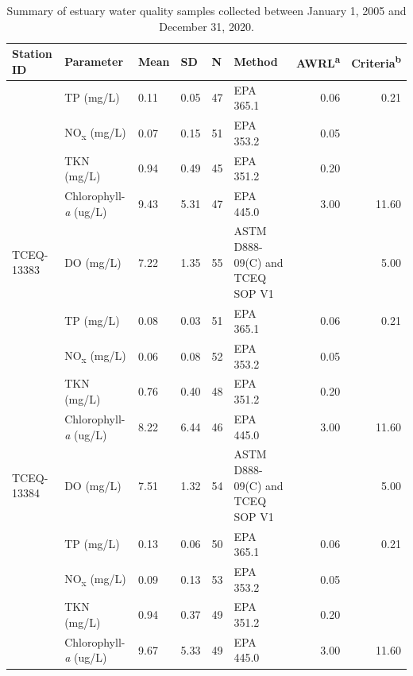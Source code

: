 \documentclass[fleqn,10pt,lineno]{wlpeerj} %
\begin{document}
\begin{table}

\caption{\label{tab:table2}Summary of estuary water quality samples collected between January 1, 2005 and December 31, 2020.}
\centering
\begin{threeparttable}
\begin{tabular}[t]{lllll>{\raggedright\arraybackslash}p{3cm}rr}
\toprule
Station ID & Parameter & Mean & SD & N & Method & AWRL\textsuperscript{a} & Criteria\textsuperscript{b}\\
\midrule
 & TP (mg/L) & 0.11 & 0.05 & 47 & EPA 365.1 & 0.06 & 0.21\\

 & NO\textsubscript{x} (mg/L) & 0.07 & 0.15 & 51 & EPA 353.2 & 0.05 & \\

 & TKN (mg/L) & 0.94 & 0.49 & 45 & EPA 351.2 & 0.20 & \\

 & Chlorophyll-\textit{a} (ug/L) & 9.43 & 5.31 & 47 & EPA 445.0 & 3.00 & 11.60\\

\multirow{-5}{*}{\raggedright\arraybackslash TCEQ-13383} & DO (mg/L) & 7.22 & 1.35 & 55 & ASTM D888-09(C) and TCEQ SOP V1 &  & 5.00\\
\cmidrule{1-8}
 & TP (mg/L) & 0.08 & 0.03 & 51 & EPA 365.1 & 0.06 & 0.21\\

 & NO\textsubscript{x} (mg/L) & 0.06 & 0.08 & 52 & EPA 353.2 & 0.05 & \\

 & TKN (mg/L) & 0.76 & 0.40 & 48 & EPA 351.2 & 0.20 & \\

 & Chlorophyll-\textit{a} (ug/L) & 8.22 & 6.44 & 46 & EPA 445.0 & 3.00 & 11.60\\

\multirow{-5}{*}{\raggedright\arraybackslash TCEQ-13384} & DO (mg/L) & 7.51 & 1.32 & 54 & ASTM D888-09(C) and TCEQ SOP V1 &  & 5.00\\
\cmidrule{1-8}
 & TP (mg/L) & 0.13 & 0.06 & 50 & EPA 365.1 & 0.06 & 0.21\\

 & NO\textsubscript{x} (mg/L) & 0.09 & 0.13 & 53 & EPA 353.2 & 0.05 & \\

 & TKN (mg/L) & 0.94 & 0.37 & 49 & EPA 351.2 & 0.20 & \\

 & Chlorophyll-\textit{a} (ug/L) & 9.67 & 5.33 & 49 & EPA 445.0 & 3.00 & 11.60\\


\end{tabular}
\end{threeparttable}
\end{table}
\end{document}
